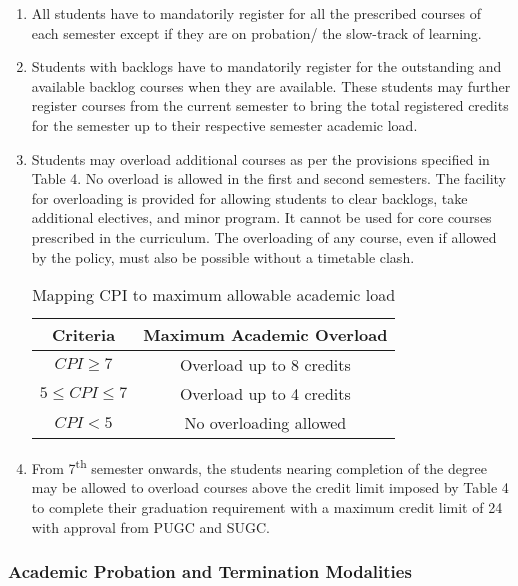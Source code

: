 \begin{enumerate}
    \item All students have to mandatorily register for all the prescribed courses of each semester except if they are on probation/ the slow-track of learning. 
    \item Students with backlogs have to mandatorily register for the outstanding and available backlog courses when they are available. These students may further register courses from the current semester to bring the total registered credits for the semester up to their respective semester academic load.
    \item Students may overload additional courses as per the provisions specified in Table 4. No overload is allowed in the first and second semesters. The facility for overloading is provided for allowing students to clear backlogs, take additional electives, and minor program. It cannot be used for core courses prescribed in the curriculum. The overloading of any course, even if allowed by the policy, must also be possible without a timetable clash.

    \begin{table}[h!]
        \centering
        \begin{tabular}{c c}
        \toprule
        \textbf{Criteria}   & \textbf{Maximum Academic Overload} \\
        \midrule
        $CPI \geq 7$          & Overload up to 8 credits \\
        $5 \leq CPI \le 7$    & Overload up to 4 credits \\
        $CPI < 5$             & No overloading allowed \\
       \bottomrule
        \end{tabular}
        \caption{Mapping CPI to maximum allowable academic load}
        \label{tab:Mapping CPI to maximum allowable academic load}
    \end{table}

    \item From 7\textsuperscript{th} semester onwards, the students nearing completion of the degree may be allowed to overload courses above the credit limit imposed by Table 4 to complete their graduation requirement with a maximum credit limit of 24 with approval from PUGC and SUGC. 
\end{enumerate}

\subsubsection{Academic Probation and Termination Modalities}

